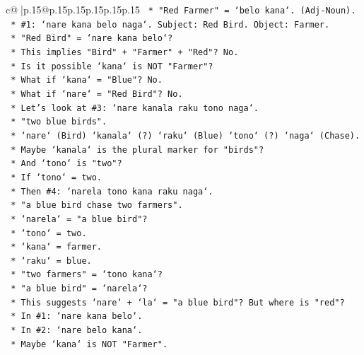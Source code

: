\documentclass{article}
\begin{document}
{\begin{supertabular}{c@{$\;$}|p{.15\linewidth}@{}p{.15\linewidth}p{.15\linewidth}p{.15\linewidth}p{.15\linewidth}p{.15\linewidth}}
{{{\texttt{            *   "Red Farmer" = `belo kana`. (Adj{-}Noun).} \\
\texttt{        *   \#1: `nare kana belo naga`. Subject: Red Bird. Object: Farmer.} \\
\texttt{            *   "Red Bird" = `nare kana belo`?} \\
\texttt{            *   This implies "Bird" + "Farmer" + "Red"? No.} \\
\texttt{            *   Is it possible `kana` is NOT "Farmer"?} \\
\texttt{            *   What if `kana` = "Blue"? No.} \\
\texttt{            *   What if `nare` = "Red Bird"? No.} \\
\texttt{            *   Let's look at \#3: `nare kanala raku tono naga`.} \\
\texttt{                *   "two blue birds".} \\
\texttt{                *   `nare` (Bird) `kanala` (?) `raku` (Blue) `tono` (?) `naga` (Chase).} \\
\texttt{                *   Maybe `kanala` is the plural marker for "birds"?} \\
\texttt{                *   And `tono` is "two"?} \\
\texttt{                *   If `tono` = two.} \\
\texttt{                *   Then \#4: `narela tono kana raku naga`.} \\
\texttt{                    *   "a blue bird chase two farmers".} \\
\texttt{                    *   `narela` = "a blue bird"?} \\
\texttt{                    *   `tono` = two.} \\
\texttt{                    *   `kana` = farmer.} \\
\texttt{                    *   `raku` = blue.} \\
\texttt{                    *   "two farmers" = `tono kana`?} \\
\texttt{                    *   "a blue bird" = `narela`?} \\
\texttt{                    *   This suggests `nare` + `la` = "a blue bird"? But where is "red"?} \\
\texttt{                    *   In \#1: `nare kana belo`.} \\
\texttt{                    *   In \#2: `nare belo kana`.} \\
\texttt{                    *   Maybe `kana` is NOT "Farmer".} \\
}}}
\end{supertabular}}
\end{document}

